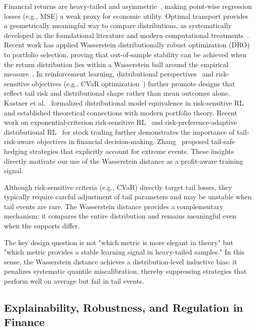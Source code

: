 Financial returns are heavy-tailed and asymmetric~\cite{cont2001empirical}, making point-wise regression losses (e.g., MSE) a weak proxy for economic utility. Optimal transport provides a geometrically meaningful way to compare distributions, as systematically developed in the foundational literature and modern computational treatments~\cite{villani2009optimal,peyre2019computational}. Recent work has applied Wasserstein distributionally robust optimization (DRO) to portfolio selection, proving that out-of-sample stability can be achieved when the return distribution lies within a Wasserstein ball around the empirical measure~\cite{pesenti2023pOrtfolio,nguyen2025robustifying}. In reinforcement learning, distributional perspectives~\cite{bellemare2017distributional} and risk-sensitive objectives (e.g., CVaR optimization~\cite{chow2015cvar}) further promote designs that reflect tail risk and distributional shape rather than mean outcomes alone. Kastner et al.~\cite{kastner2023distributional} formalized distributional model equivalence in risk-sensitive RL and established theoretical connections with modern portfolio theory. Recent work on exponential-criterion risk-sensitive RL~\cite{noorani2025risk} and risk-preference-adaptive distributional RL~\cite{ma2025towards} for stock trading further demonstrates the importance of tail-risk-aware objectives in financial decision-making. Zhang~\cite{zhang2025tail} proposed tail-safe hedging strategies that explicitly account for extreme events. These insights directly motivate our use of the Wasserstein distance as a profit-aware training signal.

Although risk-sensitive criteria (e.g., CVaR) directly target tail losses, they typically require careful adjustment of tail parameters and may be unstable when tail events are rare. The Wasserstein distance provides a complementary mechanism: it compares the entire distribution and remains meaningful even when the supports differ.

The key design question is not "which metric is more elegant in theory" but "which metric provides a stable learning signal in heavy-tailed samples." In this sense, the Wasserstein distance achieves a distribution-level inductive bias: it penalizes systematic quantile miscalibration, thereby suppressing strategies that perform well on average but fail in tail events.

\subsection{Explainability, Robustness, and Regulation in Finance}

